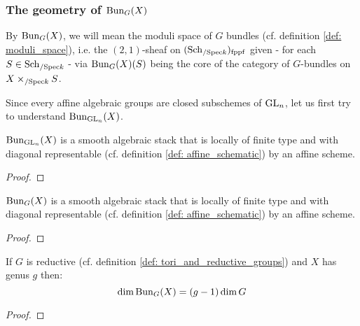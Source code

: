             \subsubsection{The geometry of \texorpdfstring{$\mathrm{Bun}_G(X)$}{}}
                \begin{definition}[$\Bun_G$] \label{def: Bun_G}
                    By $\mathrm{Bun}_G(X)$, we will mean the moduli space of $G$ bundles (cf. definition \ref{def: moduli_space}), i.e. the $(2, 1)$-sheaf on $(\mathrm{Sch}_{/\mathrm{Spec} k})_{\mathrm{fppf}}$ given - for each $S \in \mathrm{Sch}_{/\mathrm{Spec} k}$ - via $\mathrm{Bun}_G(X)(S)$ being the core of the category of $G$-bundles on $X \x_{/\Spec k} S$.
                \end{definition}
                
                Since every affine algebraic groups are closed subschemes of $\operatorname{GL}_n$, let us first try to understand $\mathrm{Bun}_{\operatorname{GL}_n}(X)$.
                \begin{proposition} \label{prop: geometry_of_Bun_GLn}
                    $\mathrm{Bun}_{\operatorname{GL}_n}(X)$ is a smooth algebraic stack that is locally of finite type and with diagonal representable (cf. definition \ref{def: affine_schematic}) by an affine scheme.
                \end{proposition}
                    \begin{proof}
                        
                    \end{proof}
                \begin{proposition} \label{prop: geometry_of_Bun_G}
                    $\mathrm{Bun}_G(X)$ is a smooth algebraic stack that is locally of finite type and with diagonal representable (cf. definition \ref{def: affine_schematic}) by an affine scheme.
                \end{proposition}
                    \begin{proof}
                        
                    \end{proof}
                    
                \begin{proposition} \label{prop: dimension_of_Bun_G}
                    If $G$ is reductive (cf. definition \ref{def: tori_and_reductive_groups}) and $X$ has genus $g$ then:
                        $$\dim \mathrm{Bun}_G(X) = (g - 1)\dim G$$
                \end{proposition}
                    \begin{proof}
                                
                    \end{proof}
            
